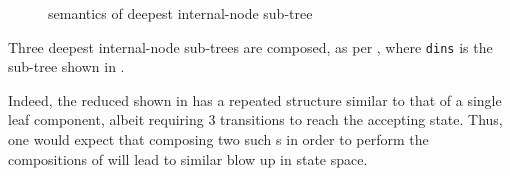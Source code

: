

\begin{figure}[ht]
    \centering
    \caption{\TNFA{} semantics of deepest internal-node sub-tree}
    \label{fig:deepestInternalNodeSubtreeTNFA}
\end{figure}

Three deepest internal-node sub-trees are composed, as per
, where \texttt{dins} is the
sub-tree shown in .

Indeed, the reduced \TNFA{} shown in
 has a repeated structure similar to
that of a single leaf component, albeit requiring 3 transitions to reach the
accepting state. Thus, one would expect that composing two such \TNFA{}s in
order to perform the compositions of
 will lead to similar blow up
in state space.

